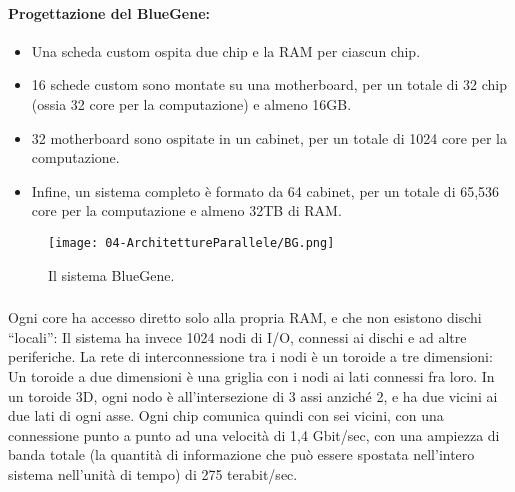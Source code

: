 
\paragraph{Progettazione del BlueGene:}

\begin{itemize}
  \item Una scheda custom ospita due chip e la RAM per ciascun chip. 
  \item 16 schede custom sono montate su una motherboard, per un totale
di 32 chip (ossia 32 core per la computazione) e almeno 16GB. 
\item 32 motherboard sono ospitate in un cabinet, per un totale di 1024
core per la computazione. 
\item Infine, un sistema
completo è formato da
64 cabinet, per un totale
di 65,536 core per la
computazione e almeno
32TB di RAM.
\end{itemize}

\begin{figure}[h]
    \centering
    \texttt{[image: 04-ArchitettureParallele/BG.png]}
    \caption{Il sistema BlueGene.}
\end{figure}
\subsubsection{}

Ogni core ha accesso diretto solo alla propria RAM, e
che non esistono dischi “locali”: Il sistema ha invece 1024 nodi di
I/O, connessi ai dischi e ad altre periferiche. La rete di interconnessione tra i nodi
è un toroide a tre dimensioni:
Un toroide a due dimensioni è una griglia
con i nodi ai lati connessi fra loro. In un toroide 3D, ogni nodo è all’intersezione
di 3 assi anziché 2, e ha due vicini ai due lati di ogni asse. Ogni chip comunica quindi con sei vicini, con una connessione
punto a punto ad una velocità di 1,4 Gbit/sec, con una ampiezza di
banda totale (la quantità di informazione che può essere spostata
nell’intero sistema nell’unità di tempo) di 275 terabit/sec. 

